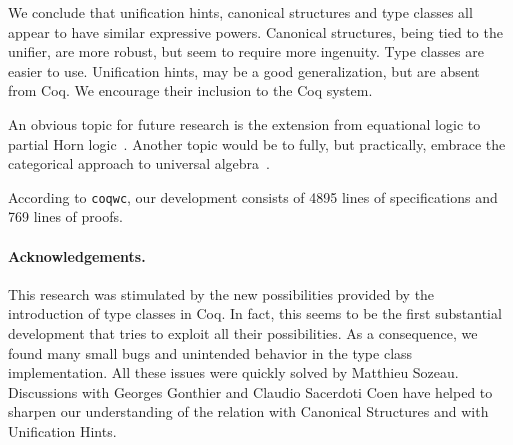 \documentclass[a4paper,10pt,runningheads]{llncs}
\begin{document}
We conclude that unification hints, canonical structures and type classes all appear to have
similar expressive powers. Canonical structures, being tied to the unifier, are more robust, but
seem to require more ingenuity. Type classes are easier to use. Unification hints, may be a
good generalization, but are absent from Coq. We encourage their inclusion to the
Coq system.

An obvious topic for future research is the extension from equational logic to partial Horn
logic~\cite{palmgren2007partial}. Another topic would be to fully, but practically, embrace the
categorical approach to universal algebra~\cite{pitts2001categorical}.

According to \lstinline|coqwc|, our development consists of 4895 lines of
specifications and 769 lines of proofs.


% 

\paragraph{Acknowledgements.}
This research was stimulated by the new possibilities provided by the introduction of type classes
in Coq. In fact, this seems to be the first substantial development that tries to exploit all their
possibilities. As a consequence, we found many small bugs and unintended behavior in the type
class implementation. All these issues were quickly solved by Matthieu Sozeau. Discussions with
Georges Gonthier and Claudio Sacerdoti Coen have helped to
sharpen our understanding of the relation with Canonical Structures and with Unification Hints.


\end{document}
